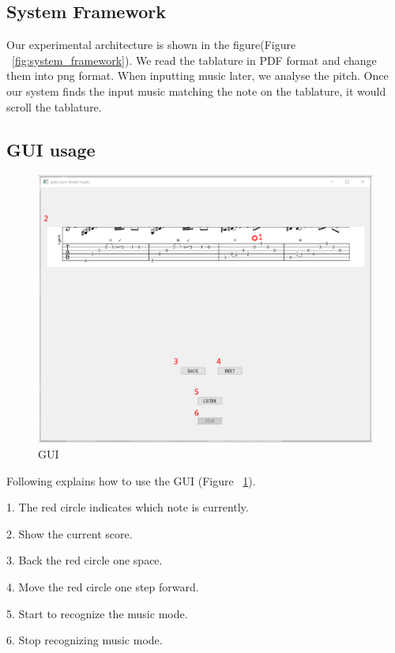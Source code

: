 \documentclass[10pt,twocolumn,letterpaper]{article}
\begin{document}
\begin{CJK}{UTF8}{bsmi}
\subsection{System Framework}

Our experimental architecture is shown in the figure(Figure ~\ref{fig:system_framework}).
We read the tablature in PDF format and change them into png format. When inputting music later, we analyse the pitch. Once our system finds the input music matching the note on the tablature, it would scroll the tablature.


\subsection{GUI usage}

\begin{figure}[t]
\begin{center}
   \includegraphics[width=0.8\linewidth]{gui.png}
\end{center}
   \caption{GUI}
\label{fig:gui}
\end{figure}

Following explains how to use the GUI (Figure ~\ref{fig:gui}).

\begin{description}
    \item 1. The red circle indicates which note is currently.
    \item 2. Show the current score.
    \item 3. Back the red circle one space.
    \item 4. Move the red circle one step forward.
    \item 5. Start to recognize the music mode.
    \item 6. Stop recognizing music mode.
\end{description}


\end{CJK}
\end{document}
